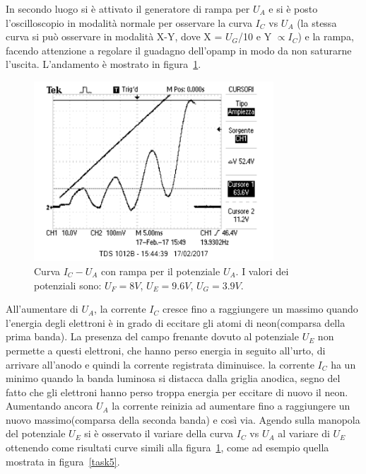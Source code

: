 \documentclass[10pt,a4paper]{article}
\begin{document}


In secondo luogo si è attivato il generatore di rampa per $U_{A}$ e si è posto l'oscilloscopio in modalità normale  per osservare la curva $I_{C}$ vs $U_{A}$ (la stessa curva si può osservare in modalità X-Y, dove X = $U_{G}$/10 e Y $\propto I_{C}$) e la rampa, facendo attenzione a regolare il guadagno dell'opamp in modo da non saturarne l'uscita. L'andamento è mostrato in figura~\ref{andamento}.

\begin{figure}[h!]
	\centering
		\includegraphics[width=0.80\textwidth]{../oscilloscopio/correnteanodicatempo1.png}
	\caption{Curva $I_{C} - U_{A}$ con rampa per il potenziale $U_{A}$. I valori dei potenziali sono: $U_{F}=\unit{8}{V}$, $U_{E}=\unit{9.6}{V}$, $U_{G}=\unit{3.9}{V}$.}
	\label{andamento}
\end{figure}


All'aumentare di $U_{A}$, la corrente $I_{C}$ cresce fino a raggiungere un massimo quando l'energia degli elettroni è in grado di eccitare gli atomi di neon(comparsa della prima banda). La presenza del campo frenante dovuto al potenziale $U_{E}$ non permette a questi elettroni, che hanno perso energia in seguito all'urto, di arrivare all'anodo e quindi la corrente registrata diminuisce. la corrente $I_{C}$ ha un minimo quando la banda luminosa si distacca dalla griglia anodica, segno del fatto che gli elettroni hanno perso troppa energia per eccitare di nuovo il neon.
Aumentando ancora $U_{A}$ la corrente reinizia ad aumentare fino a raggiungere un nuovo massimo(comparsa della seconda banda) e così via.
Agendo sulla manopola del potenziale $U_{E}$ si è osservato il variare della curva $I_{C}$ vs $U_{A}$ al variare di $U_{E}$ ottenendo come risultati curve simili alla figura~\ref{andamento}, come ad esempio quella mostrata in figura~\ref{task5}.
\end{document}
